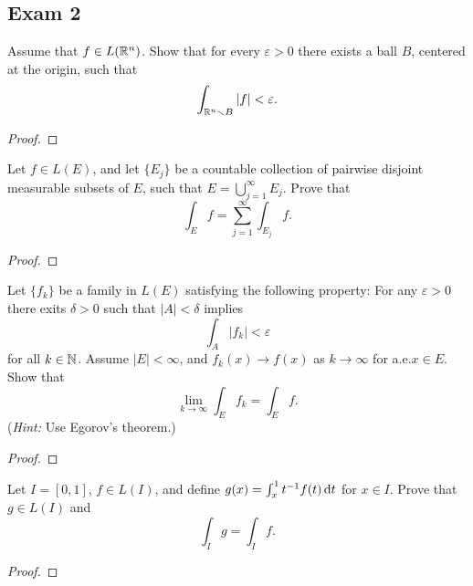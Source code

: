 \subsection{Exam 2}
\begin{problem}
Assume that $f\in L(\mathbb{R}^n)$. Show that for every $\varepsilon>0$ there
exists a ball $B$, centered at the origin, such that
\[
\int_{\mathbb{R}^n\smallsetminus B}|f|<\varepsilon.
\]
\end{problem}
\begin{proof}
\end{proof}

\begin{problem}
Let $f\in L(E)$, and let $\{E_j\}$ be a countable collection of pairwise
disjoint measurable subsets of $E$, such that $E=\bigcup_{j=1}^\infty
E_j$. Prove that
\[
\int_E f=\sum_{j=1}^\infty\int_{E_j}f.
\]
\end{problem}
\begin{proof}
\end{proof}

\begin{problem}
Let $\{f_k\}$ be a family in $L(E)$ satisfying the following property:
For any $\varepsilon>0$ there exits $\delta>0$ such that $|A|<\delta$
implies
\[
\int_A |f_k|<\varepsilon
\]
for all $k\in\mathbb{N}$. Assume $|E|<\infty$, and $f_k(x)\to f(x)$ as
$k\to\infty$ for a.e.\@ $x\in E$. Show that
\[
\lim_{k\to\infty}\int_E f_k=\int_E f.
\]
(\emph{Hint:} Use Egorov's theorem.)
\end{problem}
\begin{proof}
\end{proof}

\begin{problem}
Let $I=[0,1]$, $f\in L(I)$, and define $g(x)=\int_x^1
t^{-1}f(t) \mathop{}\!\mathrm{d} t$ for $x\in I$. Prove that $g\in L(I)$ and
\[
\int_I g=\int_I f.
\]
\end{problem}
\begin{proof}
\end{proof}

